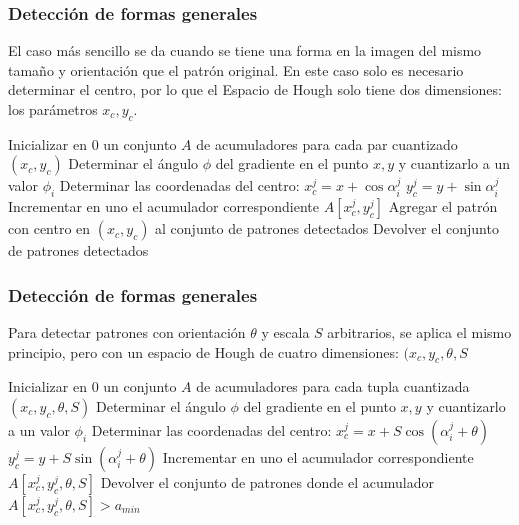 \begin{frame}\frametitle{Detección de formas generales}
  El caso más sencillo se da cuando se tiene una forma en la imagen del mismo tamaño y orientación que el patrón original. En este caso solo es necesario determinar el centro, por lo que el Espacio de Hough solo tiene dos dimensiones: los parámetros $x_c, y_c$.
  \begin{algorithm}[H]
    \small
    \DontPrintSemicolon
    \;
    Inicializar en 0 un conjunto $A$ de acumuladores para cada par cuantizado $(x_c,y_c)$\;
    {
      Determinar el ángulo $\phi$ del gradiente en el punto $x,y$ y cuantizarlo a un valor $\phi_i$\;
      {
        Determinar las coordenadas del centro:\;
        $x_c^j = x + \cos\alpha_i^j$\;
        $y_c^j = y + \sin\alpha_i^j$
        Incrementar en uno el acumulador correspondiente $A[x_c^j, y_c^j]$
      }
    }
    {
      {
        Agregar el patrón con centro en $(x_c, y_c)$ al conjunto de patrones detectados
      }
    }
    Devolver el conjunto de patrones detectados
  \end{algorithm}  
\end{frame}

\begin{frame}\frametitle{Detección de formas generales}
  Para detectar patrones con orientación $\theta$ y escala $S$ arbitrarios, se aplica el mismo principio, pero con un espacio de Hough de cuatro dimensiones: $(x_c, y_c, \theta, S$
  \begin{algorithm}[H]
    \small
    \DontPrintSemicolon
    \;
    Inicializar en 0 un conjunto $A$ de acumuladores para cada tupla cuantizada $(x_c,y_c,\theta, S)$\;
    {
      Determinar el ángulo $\phi$ del gradiente en el punto $x,y$ y cuantizarlo a un valor $\phi_i$\;
      {
        {
          {
            Determinar las coordenadas del centro:\;
            $x_c^j = x + S\cos(\alpha_i^j + \theta)$\;
            $y_c^j = y + S\sin(\alpha_i^j + \theta)$\;
            Incrementar en uno el acumulador correspondiente $A[x_c^j, y_c^j, \theta, S]$
          }
        }
      }
    }
    Devolver el conjunto de patrones donde el acumulador $A[x_c^j, y_c^j, \theta, S] > a_{min}$
  \end{algorithm}  
\end{frame}

